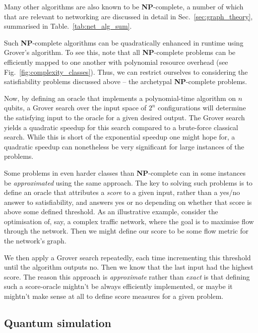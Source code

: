 Many other algorithms are also known to be \textbf{NP}-complete, a number of which that are relevant to networking are discussed in detail in Sec.~\ref{sec:graph_theory}, summarised in Table.~\ref{tab:net_alg_sum}.

Such \textbf{NP}-complete algorithms can be quadratically enhanced in runtime using Grover's algorithm. To see this, note that all \textbf{NP}-complete problems can be efficiently mapped to one another with polynomial resource overhead (see Fig.~\ref{fig:complexity_classes}). Thus, we can restrict ourselves to considering the satisfiability problems discussed above -- the archetypal \textbf{NP}-complete problems.

Now, by defining an oracle that implements a polynomial-time algorithm on $n$ qubits, a Grover search over the input space of $2^n$ configurations will determine the satisfying input to the oracle for a given desired output. The Grover search yields a quadratic speedup for this search compared to a brute-force classical search. While this is short of the exponential speedup one might hope for, a quadratic speedup can nonetheless be very significant for large instances of the problems.

Some problems in even harder classes than \textbf{NP}-complete can in some instances be \textit{approximated} using the same approach. The key to solving such problems is to define an oracle that attributes a \textit{score} to a given input, rather than a yes/no answer to satisfiability, and answers yes or no depending on whether that score is above some defined threshold. As an illustrative example, consider the optimisation of, say, a complex traffic network, where the goal is to maximise flow through the network. Then we might define our score to be some flow metric for the network's graph.

We then apply a Grover search repeatedly, each time incrementing this threshold until the algorithm outputs no. Then we know that the last input had the highest score. The reason this approach is \textit{approximate} rather than \textit{exact} is that defining such a score-oracle mightn't be always efficiently implemented, or maybe it mightn't make sense at all to define score measures for a given problem.

%
%

\subsection{Quantum simulation} \label{sec:quantum_sim_alg}

